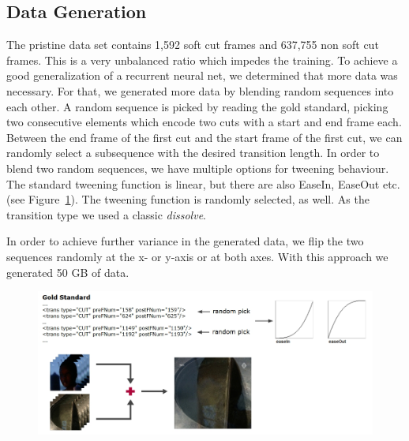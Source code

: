 \subsection{Data Generation}
\label{sec:soft_cut_data_generation}

The pristine data set contains 1,592 soft cut frames and 637,755 non soft cut frames.
This is a very unbalanced ratio which impedes the training.
To achieve a good generalization of a recurrent neural net, we determined that more data was necessary.
For that, we generated more data by blending random sequences into each other.
A random sequence is picked by reading the gold standard, picking two consecutive elements which encode two cuts with a start and end frame each.
Between the end frame of the first cut and the start frame of the first cut, we can randomly select a subsequence with the desired transition length.
In order to blend two random sequences, we have multiple options for tweening behaviour.
The standard tweening function is linear, but there are also EaseIn, EaseOut etc. (see Figure~\ref{fig:data_generation}).
The tweening function is randomly selected, as well.
As the transition type we used a classic \textit{dissolve}.

In order to achieve further variance in the generated data, we flip the two sequences randomly at the x- or y-axis or at both axes.
With this approach we generated 50 GB of data.


\begin{figure}
    \centering
    \includegraphics[scale=.5]{images/data_generation.jpg}
    \caption{}
    \label{fig:data_generation}
\end{figure}